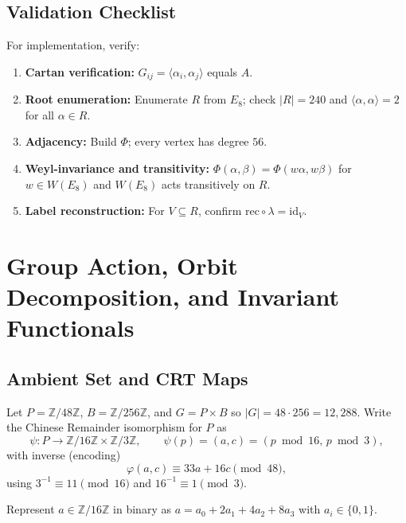 \documentclass[12pt]{article}
\begin{document}
\subsection{Validation Checklist}
For implementation, verify:
\begin{enumerate}[itemsep=2pt,topsep=4pt,leftmargin=16pt]
\item \textbf{Cartan verification: } $G_{ij}=\langle\alpha_i,\alpha_j\rangle$ equals $A$.
\item \textbf{Root enumeration: } Enumerate $R$ from $E_8$; check $|R|=240$ and $\langle\alpha,\alpha\rangle=2$ for all $\alpha\in R$.
\item \textbf{Adjacency: } Build $\Phi$; every vertex has degree $56$.
\item \textbf{Weyl-invariance and transitivity: } $\Phi(\alpha,\beta)=\Phi(w\alpha,w\beta)$ for $w\in W(E_8)$ and $W(E_8)$ acts transitively on $R$.
\item \textbf{Label reconstruction: } For $V\subseteq R$, confirm $\mathrm{rec}\circ\lambda=\mathrm{id}_V$.
\end{enumerate}



\section{Group Action, Orbit Decomposition, and Invariant Functionals}

\subsection{Ambient Set and CRT Maps}
Let $P=\mathbb Z/48\mathbb Z$, $B=\mathbb Z/256\mathbb Z$, and $G=P\times B$ so $|G|=48\cdot 256=12{,}288$. Write the Chinese Remainder isomorphism for $P$ as
\[
\psi: P\to \mathbb Z/16\mathbb Z\times \mathbb Z/3\mathbb Z,\qquad \psi(p)=(a,c)=(p\bmod 16,\, p\bmod 3),
\]
with inverse (encoding)
\[
\varphi(a,c)\equiv 33a+16c\pmod{48},
\]
using $3^{-1}\equiv 11\pmod{16}$ and $16^{-1}\equiv 1\pmod{3}$.

Represent $a\in\mathbb Z/16\mathbb Z$ in binary as $a=a_0+2a_1+4a_2+8a_3$ with $a_i\in\{0,1\}$.
\end{document}
